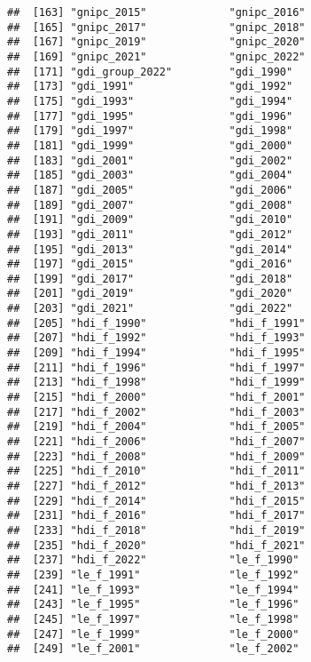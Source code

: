 \documentclass[
]{article}
\begin{document}
\begin{verbatim}
##  [163] "gnipc_2015"             "gnipc_2016"            
##  [165] "gnipc_2017"             "gnipc_2018"            
##  [167] "gnipc_2019"             "gnipc_2020"            
##  [169] "gnipc_2021"             "gnipc_2022"            
##  [171] "gdi_group_2022"         "gdi_1990"              
##  [173] "gdi_1991"               "gdi_1992"              
##  [175] "gdi_1993"               "gdi_1994"              
##  [177] "gdi_1995"               "gdi_1996"              
##  [179] "gdi_1997"               "gdi_1998"              
##  [181] "gdi_1999"               "gdi_2000"              
##  [183] "gdi_2001"               "gdi_2002"              
##  [185] "gdi_2003"               "gdi_2004"              
##  [187] "gdi_2005"               "gdi_2006"              
##  [189] "gdi_2007"               "gdi_2008"              
##  [191] "gdi_2009"               "gdi_2010"              
##  [193] "gdi_2011"               "gdi_2012"              
##  [195] "gdi_2013"               "gdi_2014"              
##  [197] "gdi_2015"               "gdi_2016"              
##  [199] "gdi_2017"               "gdi_2018"              
##  [201] "gdi_2019"               "gdi_2020"              
##  [203] "gdi_2021"               "gdi_2022"              
##  [205] "hdi_f_1990"             "hdi_f_1991"            
##  [207] "hdi_f_1992"             "hdi_f_1993"            
##  [209] "hdi_f_1994"             "hdi_f_1995"            
##  [211] "hdi_f_1996"             "hdi_f_1997"            
##  [213] "hdi_f_1998"             "hdi_f_1999"            
##  [215] "hdi_f_2000"             "hdi_f_2001"            
##  [217] "hdi_f_2002"             "hdi_f_2003"            
##  [219] "hdi_f_2004"             "hdi_f_2005"            
##  [221] "hdi_f_2006"             "hdi_f_2007"            
##  [223] "hdi_f_2008"             "hdi_f_2009"            
##  [225] "hdi_f_2010"             "hdi_f_2011"            
##  [227] "hdi_f_2012"             "hdi_f_2013"            
##  [229] "hdi_f_2014"             "hdi_f_2015"            
##  [231] "hdi_f_2016"             "hdi_f_2017"            
##  [233] "hdi_f_2018"             "hdi_f_2019"            
##  [235] "hdi_f_2020"             "hdi_f_2021"            
##  [237] "hdi_f_2022"             "le_f_1990"             
##  [239] "le_f_1991"              "le_f_1992"             
##  [241] "le_f_1993"              "le_f_1994"             
##  [243] "le_f_1995"              "le_f_1996"             
##  [245] "le_f_1997"              "le_f_1998"             
##  [247] "le_f_1999"              "le_f_2000"             
##  [249] "le_f_2001"              "le_f_2002"             

\end{verbatim}
\end{document}

